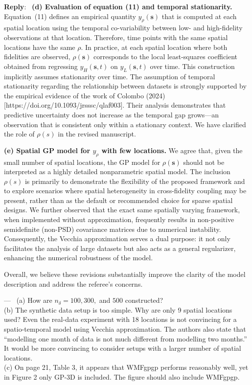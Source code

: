 \documentclass[12pt]{article}
\newcommand{\0}{\mathbf{0}}
\newcounter{reviewer}
\newcounter{point}[reviewer]
\renewcommand{\thepoint}{P\,\thereviewer.\arabic{point}}
\newenvironment{point}
   {\refstepcounter{point} \bigskip \noindent {\textbf{Point~\thepoint} } ---\ }
   {\par }
\newenvironment{reply}
   {\medskip \noindent \begin{sf}\color{Blue}\textbf{Reply}:\  }
   {\medskip \end{sf}}
\begin{document}
\begin{reply}
\medskip
\textbf{(d) Evaluation of equation (11) and temporal stationarity.}  
Equation~(11) defines an empirical quantity $y_\rho(\mathbf{s})$ that is computed at each 
spatial location using the temporal co-variability between low- and high-fidelity 
observations at that location. Therefore, time points with the same spatial locations have the same $\rho$. In practice, at each spatial location where both fidelities are observed,
$\rho(\bm{s})$ corresponds to the local least-squares coefficient obtained
from regressing $y_H(\bm{s},t)$ on $y_L(\bm{s},t)$ over time. This construction implicitly assumes stationarity over time. The assumption of temporal stationarity regarding the relationship between datasets is strongly supported by the empirical evidence of the work of Colombo (2024) [https://doi.org/10.1093/jrsssc/qlaf003]. Their analysis demonstrates that predictive uncertainty does not increase as the temporal gap grows—an observation that is consistent only within a stationary context. 
We have clarified the role of $\rho(s)$ in the revised manuscript. 

\medskip
\textbf{(e) Spatial GP model for $y_\rho$ with few locations.}  
We agree that, given the small number of spatial locations, the GP model for 
$\rho(\mathbf{s})$ should not be interpreted as a highly detailed nonparametric spatial 
model. The inclusion $\rho(s)$ is primarily to demonstrate the flexibility 
of the proposed framework and to explore scenarios where spatial heterogeneity in 
cross-fidelity coupling may be present, rather than as the default or recommended choice for sparse spatial designs. We further observed that the exact same spatially varying framework, when implemented without approximation, frequently results in non-positive semidefinite (non-PSD) covariance matrices due to numerical instability. Consequently, the Vecchia approximation serves a dual purpose: it not only facilitates the analysis of large datasets but also acts as a general regularizer, enhancing the numerical robustness of the model.

\medskip
Overall, we believe these revisions substantially improve the clarity of the model 
description and address the referee’s concerns.
\end{reply}

\begin{point}
    (a) How are $n_\delta = 100, 300,$ and $500$ constructed? \\
(b) The synthetic data setup is too simple. Why are only 9 spatial locations used? 
Even the real-data experiment with 18 locations is not convincing for a spatio-temporal 
model using Vecchia approximation. The authors also state that “modelling one month of 
data is not much different from modelling two months.” It would be more convincing to 
consider setups with a larger number of spatial locations. \\
(c) On page 21, Table 3, it appears that WMFgpgp performs reasonably well, yet in Figure 2 
only GP-3D is included. The figure should also include WMFgpgp.
\end{point}
\end{document}
